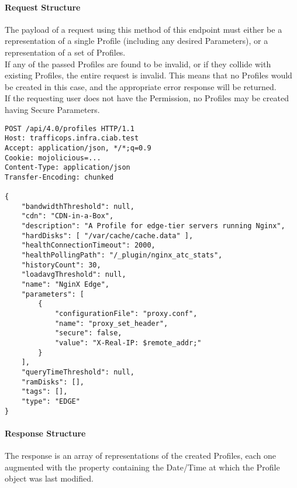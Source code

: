 \paragraph{Request Structure}
The payload of a request using this method of this endpoint must either be a
representation of a single Profile (including any desired Parameters), or a
representation of a set of Profiles.\\
If any of the passed Profiles are found to be invalid, or if they collide with
existing Profiles, the entire request is invalid. This means that no Profiles
would be created in this case, and the appropriate error response will be
returned.\\
If the requesting user does not have the  Permission,
no Profiles may be created having Secure Parameters.

\begin{codelisting}
\begin{verbatim}
POST /api/4.0/profiles HTTP/1.1
Host: trafficops.infra.ciab.test
Accept: application/json, */*;q=0.9
Cookie: mojolicious=...
Content-Type: application/json
Transfer-Encoding: chunked

{
	"bandwidthThreshold": null,
	"cdn": "CDN-in-a-Box",
	"description": "A Profile for edge-tier servers running Nginx",
	"hardDisks": [ "/var/cache/cache.data" ],
	"healthConnectionTimeout": 2000,
	"healthPollingPath": "/_plugin/nginx_atc_stats",
	"historyCount": 30,
	"loadavgThreshold": null,
	"name": "NginX Edge",
	"parameters": [
		{
			"configurationFile": "proxy.conf",
			"name": "proxy_set_header",
			"secure": false,
			"value": "X-Real-IP: $remote_addr;"
		}
	],
	"queryTimeThreshold": null,
	"ramDisks": [],
	"tags": [],
	"type": "EDGE"
}
\end{verbatim}
\end{codelisting}

\paragraph{Response Structure}
The response is an array of representations of the created Profiles, each one
augmented with the  property containing the
Date/Time at which the Profile object was last modified.

